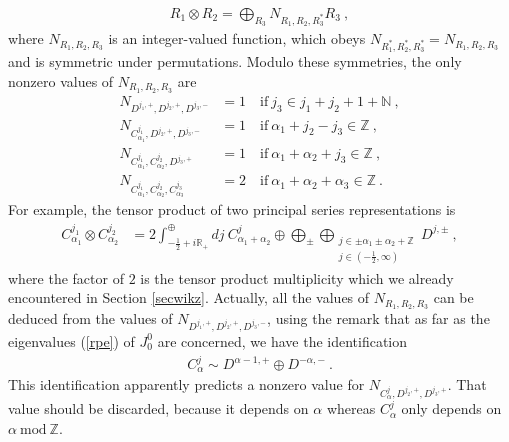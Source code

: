 \documentclass[12pt,a4paper,notitlepage]{report}
\newcommand \Z {\mathbb{Z}}
\newcommand \N {\mathbb{N}}
\newcommand \R {\mathbb{R}}
\numberwithin{equation}{section}
\theoremstyle{break}
\begin{document}
\begin{align}
 R_1\otimes R_2 = \bigoplus_{R_3} N_{R_1,R_2,R_3^*} R_3\ ,
\label{ror}
\end{align}
where $N_{R_1,R_2,R_3}$ is an integer-valued function, which obeys $N_{R_1^*,R_2^*,R_3^*}=N_{R_1,R_2,R_3}$ and is symmetric under permutations. Modulo these symmetries, the only nonzero values of $N_{R_1,R_2,R_3}$ are
\begin{align}
N_{D^{j_1,+},D^{j_2,+},D^{j_3,-}} &= 1 \quad \text{if}\ j_3\in j_1+j_2+1+\N\ ,
\label{nddd}
\\
N_{C^{j_1}_{\alpha_1},D^{j_2,+},D^{j_3,-}} &= 1 \quad \text{if}\ \alpha_1+j_2-j_3\in\Z\ ,
\\
 N_{C^{j_1}_{\alpha_1},C^{j_2}_{\alpha_2},D^{j_3,+}} &= 1 \quad \text{if}\ \alpha_1+\alpha_2+j_3\in \Z\ ,
\\
N_{C^{j_1}_{\alpha_1},C^{j_2}_{\alpha_2},C^{j_3}_{\alpha_3}} &= 2 \quad \text{if}\ \alpha_1+\alpha_2+\alpha_3\in \Z\ .
\end{align}
For example, the tensor product of two principal series representations is
\begin{align}
 C^{j_1}_{\alpha_1}\otimes C^{j_2}_{\alpha_2} &= 2\int^\oplus_{-\frac12+i\R_+} dj\ C^j_{\alpha_1+\alpha_2} 
\oplus \bigoplus_\pm \bigoplus_{\substack{j\in \pm\alpha_1\pm\alpha_2+\Z\\ j\in(-\frac12,\infty)}} D^{j,\pm} \ ,
\label{coc}
\end{align}
where the factor of $2$ is the tensor product multiplicity which we already encountered in Section \ref{secwikz}. Actually, all the values of $N_{R_1,R_2,R_3}$ can be deduced from the values of $N_{D^{j_1,+},D^{j_2,+},D^{j_3,-}}$, using the remark that as far as the eigenvalues (\ref{rpe}) of $J^0_0$ are concerned, we have the identification
\begin{align}
 C^j_\alpha \sim D^{\alpha-1,+} \oplus D^{-\alpha,-}\ .
\label{cjdd}
\end{align}
This identification apparently predicts a nonzero value for $N_{C^j_\alpha,D^{j_2,+},D^{j_3,+}}$. That value should be discarded, because it depends on $\alpha$ whereas $C^j_\alpha$ only depends on $\alpha\ \text{mod}\ \Z$.
\end{document}
